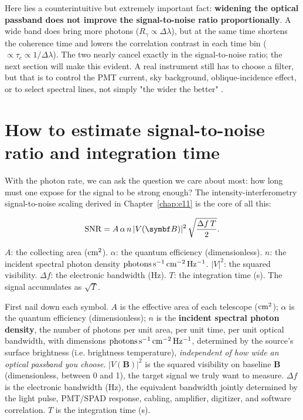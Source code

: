 Here lies a counterintuitive but extremely important fact: \textbf{widening the optical passband does not improve the signal-to-noise ratio proportionally}. A wide band does bring more photons ($R_\gamma\propto\Delta\lambda$), but at the same time shortens the coherence time and lowers the correlation contrast in each time bin ($\propto\tau_c\propto1/\Delta\lambda$). The two nearly cancel exactly in the signal-to-noise ratio; the next section will make this evident. A real instrument still has to choose a filter, but that is to control the PMT current, sky background, oblique-incidence effect, or to select spectral lines, not simply "the wider the better" \citep{2020MNRAS.491.1540A,2024MNRAS.529.4387A}.

\section{How to estimate signal-to-noise ratio and integration time}
\label{sec:e15-snr}

With the photon rate, we can ask the question we care about most: how long must one expose for the signal to be strong enough? The intensity-interferometry signal-to-noise scaling derived in Chapter~\ref{chap:e11} is the core of all this:

\begin{equation}
  {\rm SNR}
  = A\,\alpha\,n\,|V(\bm B)|^2\,
    \sqrt{\frac{\Delta f\,T}{2}} .
  \label{eq:e15-snr}
\end{equation}
\begin{formulaexplain}
$A$: the collecting area (${\rm cm^2}$). $\alpha$: the quantum efficiency (dimensionless). $n$: the incident spectral photon density ${\rm photons\,s^{-1}\,cm^{-2}\,Hz^{-1}}$. $|V|^2$: the squared visibility. $\Delta f$: the electronic bandwidth (Hz). $T$: the integration time (s). The signal accumulates as $\sqrt{T}$.
\end{formulaexplain}

First nail down each symbol. $A$ is the effective area of each telescope (${\rm cm^2}$); $\alpha$ is the quantum efficiency (dimensionless); $n$ is the \textbf{incident spectral photon density}, the number of photons per unit area, per unit time, per unit optical bandwidth, with dimensions ${\rm photons\,s^{-1}\,cm^{-2}\,Hz^{-1}}$, determined by the source's surface brightness (i.e. brightness temperature), \emph{independent of how wide an optical passband you choose}. $|V(\bm B)|^2$ is the squared visibility on baseline $\bm B$ (dimensionless, between 0 and 1), the target signal we truly want to measure. $\Delta f$ is the electronic bandwidth (Hz), the equivalent bandwidth jointly determined by the light pulse, PMT/SPAD response, cabling, amplifier, digitizer, and software correlation. $T$ is the integration time (s).

